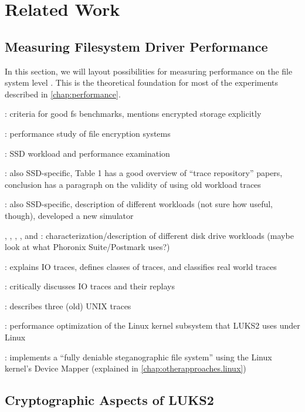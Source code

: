 \section{Related Work}
\label{chap:relatedwork}

\subsection{Measuring Filesystem Driver Performance}
\label{chap:relatedwork.fsperformance}
In this section, we will layout possibilities for measuring performance on the file system level . This is the theoretical foundation for most of the experiments described in \autoref{chap:performance}.

\cite{Traeger2008}: criteria for good fs benchmarks, mentions encrypted storage explicitly

\cite{Wright2003}: performance study of file encryption systems

\cite{Agrawal2008}: SSD workload and performance examination

\cite{Yadgar2021}: also SSD-specific, Table 1 has a good overview of ``trace repository'' papers, conclusion has a paragraph on the validity of using old workload traces

\cite{He2017}: also SSD-specific, description of different workloads (not sure how useful, though), developed a new simulator

\cite{Riska2006}, \cite{Riska2006a}, \cite{Leung2008}, \cite{Riska2009}, and \cite{Sehgal2010}: characterization/description of different disk drive workloads (maybe look at what Phoronix Suite/Postmark uses?)

\cite{Seo2014}: explains IO traces, defines classes of traces, and classifies real world traces

\cite{Pereira2013}: critically discusses IO traces and their replays

\cite{Ruemmler1993}: describes three (old) UNIX traces

\cite{Korchagin2020}: performance optimization of the Linux kernel subsystem that LUKS2 uses under Linux

\cite{Barker2019}: implements a ``fully deniable steganographic file system'' using the Linux kernel's Device Mapper (explained in \autoref{chap:otherapproaches.linux})

\subsection{Cryptographic Aspects of LUKS2}
\label{chap:relatedwork.cryptography}

